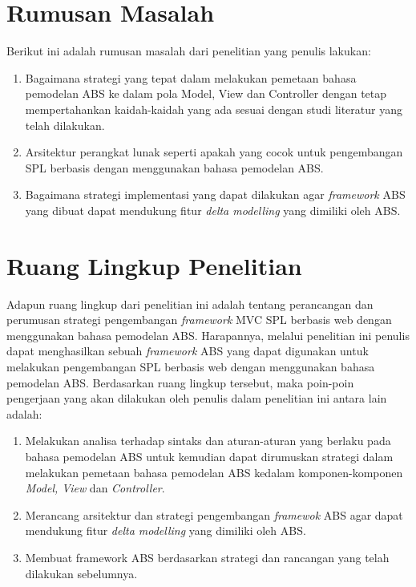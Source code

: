 \section{Rumusan Masalah}
\noindent
Berikut ini adalah rumusan masalah dari penelitian yang penulis lakukan:

\begin{enumerate}
    \item Bagaimana strategi yang tepat dalam melakukan pemetaan bahasa pemodelan ABS ke dalam pola Model, View dan Controller dengan tetap mempertahankan kaidah-kaidah yang ada sesuai dengan studi literatur yang telah dilakukan.
    \item Arsitektur perangkat lunak seperti apakah yang cocok untuk pengembangan SPL berbasis dengan menggunakan bahasa pemodelan ABS.
    \item Bagaimana strategi implementasi yang dapat dilakukan agar \textit{framework} ABS yang dibuat dapat mendukung fitur \textit{delta modelling} yang dimiliki oleh ABS. 
\end{enumerate}

\section{Ruang Lingkup Penelitian}
\noindent
Adapun ruang lingkup dari penelitian ini adalah tentang perancangan dan perumusan strategi pengembangan \textit{framework} MVC SPL berbasis web dengan menggunakan bahasa pemodelan ABS. Harapannya, melalui penelitian ini penulis dapat menghasilkan sebuah \textit{framework} ABS yang dapat digunakan untuk melakukan pengembangan SPL berbasis web dengan menggunakan bahasa pemodelan ABS. Berdasarkan ruang lingkup tersebut, maka poin-poin pengerjaan yang akan dilakukan oleh penulis dalam penelitian ini antara lain adalah:

\begin{enumerate}
    \item Melakukan analisa terhadap sintaks dan aturan-aturan yang berlaku pada bahasa pemodelan ABS untuk kemudian dapat dirumuskan strategi dalam melakukan pemetaan bahasa pemodelan ABS kedalam komponen-komponen \textit{Model, View} dan \textit{Controller}.
    \item Merancang arsitektur dan strategi pengembangan \textit{framewok} ABS agar dapat mendukung fitur \textit{delta modelling} yang dimiliki oleh ABS.
    \item Membuat framework ABS berdasarkan strategi dan rancangan yang telah dilakukan sebelumnya.
\end{enumerate}

